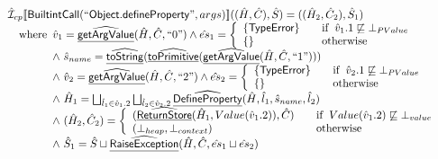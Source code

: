 \documentclass{article}
\newcommand{\SF}[1]{\mbox{\textsf{#1}}}
\newcommand{\wherec}[1]{{\rm where}\begin{array}[t]{l}#1\end{array}}
\newcommand{\ifc}[1]{{\rm if}\begin{array}[t]{l}#1\end{array}}
\newcommand{\owc}{{\rm otherwise}}
\newcommand{\aI}{\hat{\mathcal{I}}}
\newcommand{\lbr}{\llbracket}
\newcommand{\rbr}{\rrbracket}
\newcommand{\ahf}[1]{\widehat{\underline{\sf #1}}}
\begin{document}
\[\begin{array}{l}
\aI _{cp}\lbr \SF{BuiltintCall}(``\SF{Object.defineProperty}",args)\rbr((\hat{H},\hat{C}), \hat{S})
  = ((\hat{H}_2, \hat{C}_2), \hat{S}_1)\\
\quad\wherec{
  \hat{v}_1 =\ahf{getArgValue}(\hat{H}, \hat{C}, ``0")
  \land \hat{es}_1 =
    \left\{
    \begin{array}{l@{\quad\quad}l}
      \{ \SF{TypeError} \} & \ifc{\hat{v}_1.1 \not\sqsubseteq \bot_{PValue}}\\
      \{ \}& \owc\\
    \end{array}
    \right.\\
  \land\ \hat{s}_{name} = \ahf{toString}(\ahf{toPrimitive}(\ahf{getArgValue}(\hat{H}, \hat{C}, ``1")))\\
  \land\ \hat{v}_2 =\ahf{getArgValue}(\hat{H}, \hat{C}, ``2")
  \land \hat{es}_2 =
    \left\{
    \begin{array}{l@{\quad\quad}l}
      \{ \SF{TypeError} \} & \ifc{\hat{v}_2.1 \not\sqsubseteq \bot_{PValue}}\\
      \{ \}& \owc\\
    \end{array}
    \right.\\
  \land\ \hat{H}_1 = \bigsqcup_{\hat{l}_1 \in \hat{v}_1.2} \bigsqcup_{\hat{l}_2 \in \hat{v}_2.2}
    \ahf{DefineProperty}(\hat{H}, \hat{l}_1, \hat{s}_{name}, \hat{l}_2)\\
  \land\ (\hat{H}_2, \hat{C}_2) = 
    \left\{\begin{array}{l@{\quad\quad}l}
      (\ahf{ReturnStore}(\hat{H}_1, Value(\hat{v}_1.2)), \hat{C})
      & \ifc{Value(\hat{v}_1.2) \not\sqsubseteq \bot_{value}}\\
      (\bot_{heap}, \bot_{context}) & \owc \\
    \end{array}\right.\\
  \land\ \hat{S}_1 = \hat{S} \sqcup \ahf{RaiseException}(\hat{H}, \hat{C}, \hat{es}_1 \sqcup \hat{es}_2)\\
  }\\
\\\\ 


\end{array}\]
\end{document}
